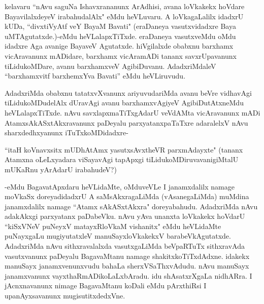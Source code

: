 kelavaru ``nAvu saguNa Ishavxrananunx ArAdhisi, avana loVkakekx hoVdare BayavilalxdeyeV irabahudalAlx" eMdu heVLuvaru. A loVkagaLalilx idadxrU kUDa, ``divxtiVyAtf veY BayaM Bavati" (eraDaneya vasutxvidadxre Baya uMTAgutatxde.)-eMdu heVLalapxTiTxde. eraDaneya vasutxveMdu oMdu idadxre Aga avanige BayaveV Agutatxde. hiVgilalxde obabxnu barxhamx vicAravanunx mADidare, barxhamx vicAramADi tananx savxrUpavanunx tiLidukoMDare, avanu barxhamxveV AgibiDuvanu. AdadxriMdaleV ``barxhamxvitf barxhemxYva Bavati'' eMdu heVLiruvudu.

AdadxriMda obabxnu tatatxvXvanunx ariyuvudariMda avanu beVre vidhavAgi tiLidukoMDudelAlx dUravAgi avanu barxhamxvAgiyeV AgibiDutAtxneMdu heVLalapxTiTxde. nAvu savxlapxmaTiTxgAdarU veVdAMta vicAravanunx mADi AtamxsAkASxtAkxravanunx paDeyalu parxyatanxpaTaTxre adaralelxV nAvu sharxdedhxyanunx iTuTxkoMDidadxre-

``itaH koVnavxsitx mUDhAtAmx yasutxsAvxtheVR parxmAdayxte" (tananx Atamxna oLeLxyadara viSayavAgi tapApxgi tiLidukoMDiruvavanigiMtalU mUKaRnu yArAdarU irabahudeV?)

-eMdu BagavatApxdaru heVLidaMte, oMduveVLe I janamxdalilx namage moVkaSx doreyadidadxrU A saMsAkxragaLiMda (vAsanegaLiMda) muMdina janamxdalilx namage ``Atamx sAkASxtAkxra" doreyabahudu. AdadxriMda nAvu adakAkxgi parxyatanx paDabeVku. nAvu yAva unanxta loVkakekx hoVdarU ``kiSxVNeV puNeyxV matayxRloVkaM vishanitx" eMdu heVLidaMte puNayxgaLu mugiyutatxleV manuSayxloVkakekxV barabeVkAgutatxde. AdadxriMda nAvu sithxravalalxda vasutxgaLiMda beVpaRTuTx sithxravAda vasutxvanunx paDeyalu BagavaMtanu namage shakitxkoTiTxdAdxne. idakekx manuSayx janamxvenunxvudu bahaLa sherxVSaThxvAdudu. nAvu manuSayx janamxvanunx vayxthaRmADikoLaLxbAradu. idu shAsatxrXgaLa nidhARra. I jAcnxnavanunx nimage BagavaMtanu koDali eMdu pArxthiRsi I upanAyxsavanunx mugisutitxdedxVne.


\endchapter
